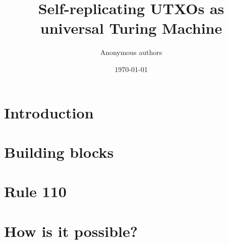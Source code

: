 \documentclass[preprint]{revtex4-1}
\begin{document}
    \title{Self-replicating UTXOs as universal Turing Machine}

    \author{Anonymous authors}

    \date{\today}

    \begin{abstract}
    \end{abstract}

    \maketitle

    \section{Introduction}


    \section{Building blocks}



    \section{Rule 110}


    \section{How is it possible?}

\end{document}
